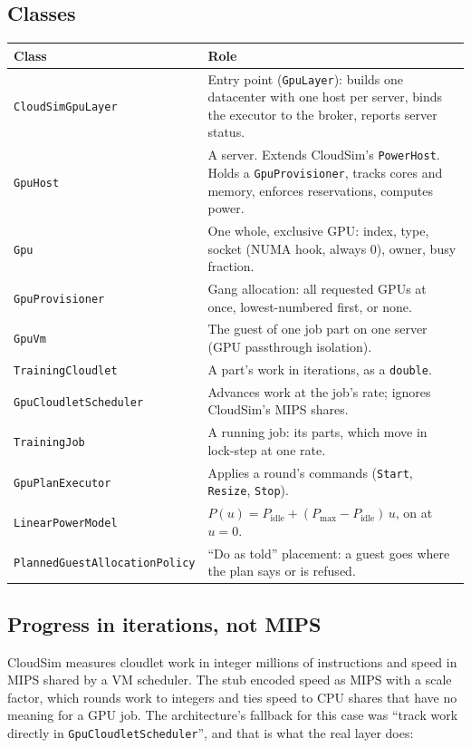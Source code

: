 \documentclass[11pt,a4paper]{article}
\newcommand{\code}[1]{\texttt{#1}}
\begin{document}
\subsection{Classes}

\begin{center}
\begin{tabularx}{\linewidth}{@{}lX@{}}
\toprule
Class & Role \\
\midrule
\code{CloudSimGpuLayer} & Entry point (\code{GpuLayer}): builds one datacenter with one host per
  server, binds the executor to the broker, reports server status. \\
\code{GpuHost} & A server. Extends CloudSim's \code{PowerHost}. Holds a \code{GpuProvisioner},
  tracks cores and memory, enforces reservations, computes power. \\
\code{Gpu} & One whole, exclusive GPU: index, type, socket (NUMA hook, always 0), owner, busy fraction. \\
\code{GpuProvisioner} & Gang allocation: all requested GPUs at once, lowest-numbered first, or none. \\
\code{GpuVm} & The guest of one job part on one server (GPU passthrough isolation). \\
\code{TrainingCloudlet} & A part's work in iterations, as a \code{double}. \\
\code{GpuCloudletScheduler} & Advances work at the job's rate; ignores CloudSim's MIPS shares. \\
\code{TrainingJob} & A running job: its parts, which move in lock-step at one rate. \\
\code{GpuPlanExecutor} & Applies a round's commands (\code{Start}, \code{Resize}, \code{Stop}). \\
\code{LinearPowerModel} & $P(u) = P_\text{idle} + (P_\text{max} - P_\text{idle})\,u$, on at $u = 0$. \\
\code{PlannedGuestAllocationPolicy} & ``Do as told'' placement: a guest goes where the plan says or is refused. \\
\bottomrule
\end{tabularx}
\end{center}

\subsection{Progress in iterations, not MIPS}
CloudSim measures cloudlet work in integer millions of instructions and speed in MIPS shared by a
VM scheduler. The stub encoded speed as MIPS with a scale factor, which rounds work to integers and
ties speed to CPU shares that have no meaning for a GPU job. The architecture's fallback for this
case was ``track work directly in \code{GpuCloudletScheduler}'', and that is what the real layer does:
\end{document}
